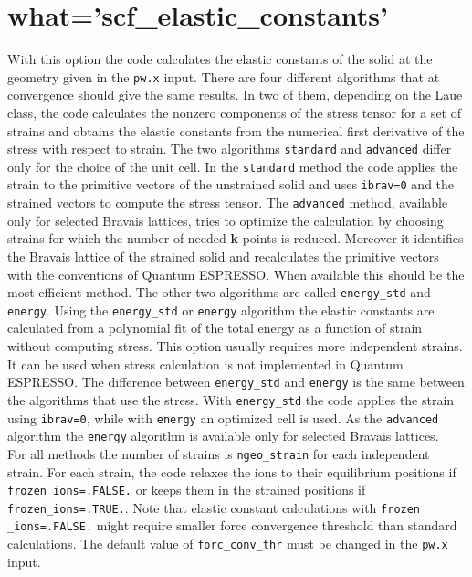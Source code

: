 \documentclass[12pt,a4paper,twoside]{report}
\def\qe{{\sc Quantum ESPRESSO}}
\begin{document}
\newpage
{\color{coral}\section{what='scf\_elastic\_constants'}}
\color{black}
With this option the code calculates the elastic constants of the solid
at the geometry given in the \texttt{pw.x} input. 
There are four different algorithms that at convergence should give the
same results. In two of them, depending on the Laue class, the code 
calculates the nonzero components of the stress tensor for a set of strains
and obtains the elastic constants from the numerical first derivative
of the stress with respect to strain.
The two algorithms \texttt{standard} and \texttt{advanced} differ
only for the choice of the unit cell. In the \texttt{standard} method the
code applies the strain to the primitive vectors of the unstrained solid
and uses \texttt{ibrav=0} and the strained vectors to compute the stress
tensor.
The \texttt{advanced} method, available only for selected Bravais lattices, 
tries to optimize the calculation by choosing strains for which the number
of needed {\bf k}-points is reduced. Moreover it identifies the 
Bravais lattice of the strained solid and recalculates the primitive
vectors with the conventions of \qe. When available this should be the
most efficient method.
The other two algorithms are called \texttt{energy\_std} and \texttt{energy}.
Using the \texttt{energy\_std} or \texttt{energy} algorithm the elastic 
constants are calculated 
from a polynomial fit of the total energy as a function of strain 
without computing stress. This option usually requires more independent 
strains. It can be used when stress calculation is not implemented in \qe.
The difference between \texttt{energy\_std} and \texttt{energy} is 
the same between the algorithms that use the stress. With
\texttt{energy\_std} the code applies the strain using \texttt{ibrav=0},
while with \texttt{energy} an optimized cell is used. As the
\texttt{advanced} algorithm the \texttt{energy} algorithm is available
only for selected Bravais lattices.\\
For all methods the number of strains is \texttt{ngeo\_strain}
for each independent strain. 
For each strain, the code relaxes the ions to their equilibrium 
positions if \texttt{frozen\_ions=.FALSE.} or keeps them
in the strained positions if \texttt{frozen\_ions=.TRUE.}. 
Note that elastic constant calculations with \texttt{frozen}
\texttt{\_ions=.FALSE.}
might require smaller force convergence threshold than standard calculations. 
The default value of \texttt{forc\_conv\_thr} must be changed in the 
\texttt{pw.x} input.
\end{document}

